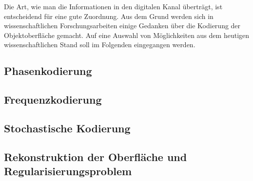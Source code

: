 \noindent
Die Art, wie man die Informationen in den digitalen Kanal überträgt, ist entscheidend für eine gute Zuordnung.
Aus dem Grund werden sich in wissenschaftlichen Forschungsarbeiten einige Gedanken über die Kodierung der Objektoberfläche gemacht.
Auf eine Auswahl von Möglichkeiten aus dem heutigen wissenschaftlichen Stand soll im Folgenden eingegangen werden.
%
{
	\FloatBarrier
    \subsection{Phasenkodierung}
    \label{sub:phasenKodierung}
    
}
%
{
	\FloatBarrier
    \subsection{Frequenzkodierung}
    \label{sub:frequenzKodierung}
    
}
%
{
	\FloatBarrier
    \subsection{Stochastische Kodierung}
    \label{sub:stochastischeKodierung}
    
}
%
{
	\FloatBarrier
    \subsection{Rekonstruktion der Oberfläche und Regularisierungsproblem}
    \label{sub:rekonstruktionUndRegularisierungsproblem}
    
}
%
